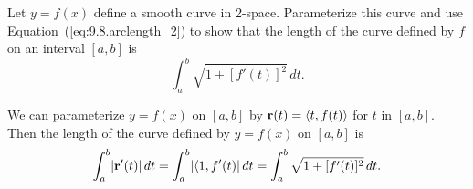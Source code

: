 \begin{activity} \label{A:9.8.3} Let $y = f(x)$ define a smooth curve in 2-space. Parameterize this curve and use Equation~(\ref{eq:9.8.arclength_2}) to show that the length of the curve defined by $f$ on an interval $[a,b]$ is
\[\int_a^b \sqrt{1+[f'(t)]^2} \, dt.\]


\end{activity}
\begin{smallhint}

\end{smallhint}
\begin{bighint}

\end{bighint}
\begin{activitySolution}
We can parameterize $y=f(x)$ on $[a,b]$ by $\mathbf{r}(t) = \langle t, f(t) \rangle$ for $t$ in $[a,b]$. Then the length of the curve defined by $y=f(x)$ on $[a,b]$ is
\[\int_a^b \lvert \mathbf{r}'(t) \rvert \, dt =  \int_a^b \lvert \langle 1, f'(t) \rvert \, dt = \int_a^b \sqrt{1+[f'(t)]^2} \, dt.\]
\end{activitySolution}
\aftera
